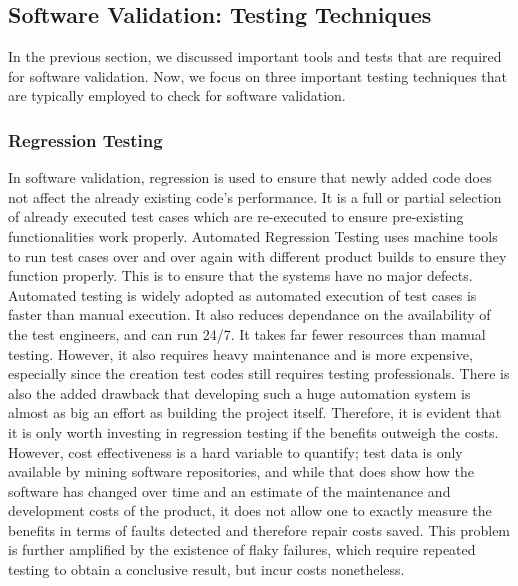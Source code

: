 \documentclass[journal, onecolumn]{IEEEtran}
\begin{document}
	\subsection{Software Validation: Testing Techniques}
	\bigskip
	In the previous section, we discussed important tools and tests that are required for software validation. Now, we focus on three important testing techniques that are typically employed to check for software validation. 
	\newline \newline
	\subsubsection{Regression Testing}
	
	In software validation, regression is used to ensure that newly added code does not affect the already existing code’s performance. It is a full or partial selection of already executed test cases which are re-executed to ensure pre-existing functionalities work properly.
	\newline \newline
	Automated Regression Testing uses machine tools to run test cases over and over again with different product builds to ensure they function properly. This is to ensure that the systems have no major defects. Automated testing is widely adopted as automated execution of test cases is faster than manual execution. It also reduces dependance on the availability of the test engineers, and can run 24/7. It takes far fewer resources than manual testing. However, it also requires heavy maintenance and is more expensive, especially since the creation test codes still requires testing professionals. There is also the added drawback that developing such a huge automation system is almost as big an effort as building the project itself.
	\newline \newline
	Therefore, it is evident that it is only worth investing in regression testing if the benefits outweigh the costs. However, cost effectiveness is a hard variable to quantify; test data is only available by mining software repositories, and while that does show how the software has changed over time and an estimate of the maintenance and development costs of the product, it does not allow one to exactly measure the benefits in terms of faults detected and therefore repair costs saved. This problem is further amplified by the existence of flaky failures, which require repeated testing to obtain a conclusive result, but incur costs nonetheless.
\end{document}
